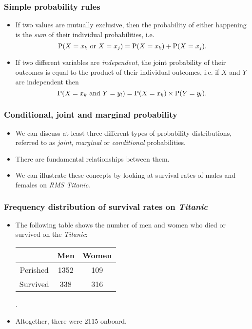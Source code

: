 \documentclass[10pt,xcolor=dvipsnames,serif,professionalfont]{beamer} %
\begin{document}
\begin{frame}
\frametitle{Simple probability rules}
\begin{itemize}
\item If two values are mutually exclusive, then the probability of either happening is the \emph{sum} of their individual probabilities, i.e.
\begin{equation}
\mathrm{P}( X=x_k \ \text{or} \ X=x_j ) = \mathrm{P}( X=x_k ) + \mathrm{P}( X=x_j ).
\end{equation}
\item If two different variables are \emph{independent}, the joint probability of their outcomes is equal to the product of their individual outcomes, i.e. if $X$ and $Y$ are independent then
\begin{equation}
\Prob{X=x_k \ \text{and} \ Y=y_l} = \Prob{X=x_k} \times \Prob{Y=y_l}.
\end{equation}
\end{itemize}
\end{frame}
\begin{frame}
\frametitle{Conditional, joint and marginal probability}
\begin{itemize}
\item We can discuss at least three different types of probability distributions,
referred to as \emph{joint}, \emph{marginal} or \emph{conditional} probabilities. 
\item There are
fundamental relationships between them. 
\item We can illustrate these concepts by looking at survival rates of males and females on \emph{RMS Titanic}.
\end{itemize}
\end{frame}

\begin{frame}
\frametitle{Frequency distribution of survival rates on \emph{Titanic}}
\begin{itemize}
\item The following table shows the number of men and women who died or survived on the \emph{Titanic}:

\begin{center}
\begin{table}
\begin{tabular}{c|cc}
& Men & Women \\\hline
Perished & 1352 & 109 \\
Survived & 338 & 316 \\
\end{tabular}.
\end{table}
\end{center}
\item Altogether, there were 2115 onboard.
\end{itemize}
\end{frame}
\end{document}
